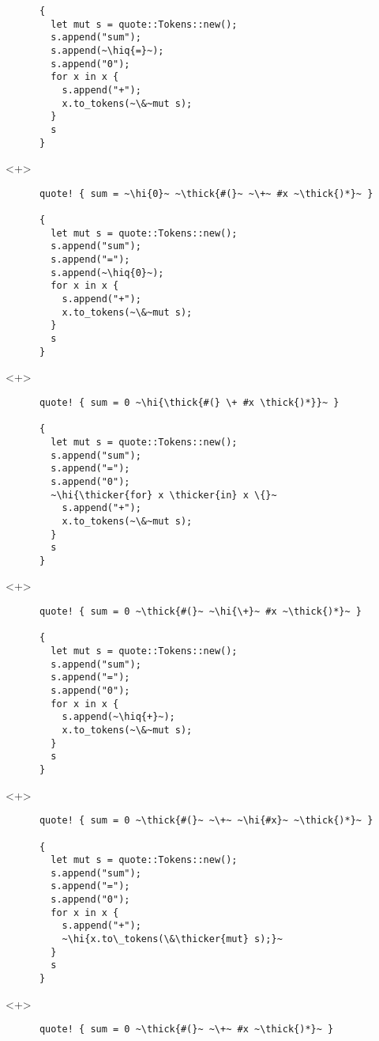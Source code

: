 \documentclass[usepdftitle=false]{beamer}
\renewcommand{\&}{\makebox[\widthof{\ampersand}][c]{\scalebox{0.9}[1.0]{\Book\ampersand}}}
\newcommand{\+}{\makebox[\widthof{+}][c]{\raisebox{-.2\height}{\scalefont{1.5}\Light+}}}
\newcommand{\thick}[1]{\contourlength{0.12pt}\contour[10]{black}{#1}}
\newcommand{\thicker}[1]{\contourlength{0.26pt}\contour[10]{black}{#1}}
\newcommand{\hi}[1]{%
\tikz[baseline=(A.base)]
 \node[highlighting=0,inner sep=0pt,text depth=0pt] (A) {#1};%
}
\newcommand{\hiq}[1]{\hi{''#1''}}
\begin{document}
\begin{frame}[fragile]
\begin{onlyenv}
\begin{verbatim}
      {
        let mut s = quote::Tokens::new();
        s.append("sum");
        s.append(~\hiq{=}~);
        s.append("0");
        for x in x {
          s.append("+");
          x.to_tokens(~\&~mut s);
        }
        s
      }
    \end{verbatim}
  \end{onlyenv}
  \begin{onlyenv}<+>
    \begin{verbatim}
      quote! { sum = ~\hi{0}~ ~\thick{#(}~ ~\+~ #x ~\thick{)*}~ }

      {
        let mut s = quote::Tokens::new();
        s.append("sum");
        s.append("=");
        s.append(~\hiq{0}~);
        for x in x {
          s.append("+");
          x.to_tokens(~\&~mut s);
        }
        s
      }
    \end{verbatim}
  \end{onlyenv}
  \begin{onlyenv}<+>
    \begin{verbatim}
      quote! { sum = 0 ~\hi{\thick{#(} \+ #x \thick{)*}}~ }

      {
        let mut s = quote::Tokens::new();
        s.append("sum");
        s.append("=");
        s.append("0");
        ~\hi{\thicker{for} x \thicker{in} x \{}~
          s.append("+");
          x.to_tokens(~\&~mut s);
        }
        s
      }
    \end{verbatim}
  \end{onlyenv}
  \begin{onlyenv}<+>
    \begin{verbatim}
      quote! { sum = 0 ~\thick{#(}~ ~\hi{\+}~ #x ~\thick{)*}~ }

      {
        let mut s = quote::Tokens::new();
        s.append("sum");
        s.append("=");
        s.append("0");
        for x in x {
          s.append(~\hiq{+}~);
          x.to_tokens(~\&~mut s);
        }
        s
      }
    \end{verbatim}
  \end{onlyenv}
  \begin{onlyenv}<+>
    \begin{verbatim}
      quote! { sum = 0 ~\thick{#(}~ ~\+~ ~\hi{#x}~ ~\thick{)*}~ }

      {
        let mut s = quote::Tokens::new();
        s.append("sum");
        s.append("=");
        s.append("0");
        for x in x {
          s.append("+");
          ~\hi{x.to\_tokens(\&\thicker{mut} s);}~
        }
        s
      }
    \end{verbatim}
  \end{onlyenv}
  \begin{onlyenv}<+>
    \begin{verbatim}
      quote! { sum = 0 ~\thick{#(}~ ~\+~ #x ~\thick{)*}~ }


\end{verbatim}
\end{onlyenv}
\end{frame}
\end{document}

